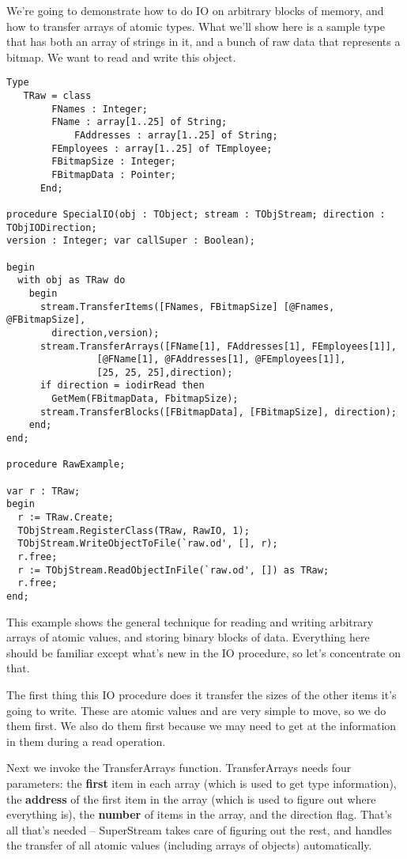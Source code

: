 \documentclass{report}
\begin{document}
We're going to demonstrate how to do IO on arbitrary blocks of memory, and
how to transfer arrays of atomic types. What we'll show here is a sample
type that has both an array of strings in it, and a bunch of raw data that
represents a bitmap. We want to read and write this object.

\begin{lstlisting}
Type
   TRaw = class
	    FNames : Integer;
	    FName : array[1..25] of String;
            FAddresses : array[1..25] of String;
	    FEmployees : array[1..25] of TEmployee;
	    FBitmapSize : Integer;
	    FBitmapData : Pointer;
	  End;

procedure SpecialIO(obj : TObject; stream : TObjStream; direction : TObjIODirection;
version : Integer; var callSuper : Boolean);

begin
  with obj as TRaw do
    begin
      stream.TransferItems([FNames, FBitmapSize] [@Fnames, @FBitmapSize], 
		direction,version);
      stream.TransferArrays([FName[1], FAddresses[1], FEmployees[1]],
			    [@FName[1], @FAddresses[1], @FEmployees[1]],
			    [25, 25, 25],direction);
      if direction = iodirRead then
        GetMem(FBitmapData, FbitmapSize);
      stream.TransferBlocks([FBitmapData], [FBitmapSize], direction);
    end;
end;

procedure RawExample;

var r : TRaw;
begin
  r := TRaw.Create;
  TObjStream.RegisterClass(TRaw, RawIO, 1);
  TObjStream.WriteObjectToFile(`raw.od', [], r);
  r.free;
  r := TObjStream.ReadObjectInFile(`raw.od', []) as TRaw;
  r.free;
end;
\end{lstlisting}

This example shows the general technique for reading and writing arbitrary
arrays of atomic values, and storing binary blocks of data. Everything here
should be familiar except what's new in the IO procedure, so let's
concentrate on that.

The first thing this IO procedure does it transfer the sizes of the other
items it's going to write. These are atomic values and are very simple to
move, so we do them first. We also do them first because we may need to get
at the information in them during a read operation.

Next we invoke the TransferArrays function. TransferArrays needs four
parameters: the \textbf{ first} item in each array (which is used to get
type information), the \textbf{address} of the first item in the array
(which is used to figure out where everything is), the \textbf{ number } of
items in the array, and the direction flag. That's all that's needed --
SuperStream takes care of figuring out the rest, and handles the transfer of
all atomic values (including arrays of objects) automatically.
\end{document}
